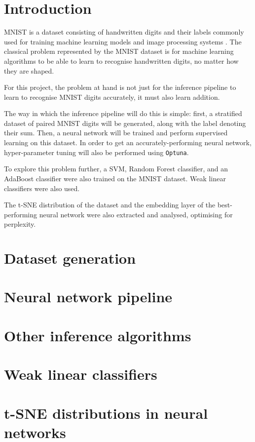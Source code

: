 \documentclass[11pt,a4paper]{article}
\begin{document}
 

\section{Introduction}

MNIST is a dataset consisting of handwritten digits and their labels commonly used for training machine learning models and image processing systems \citep{deng2012mnist}. The classical problem represented by the MNIST dataset is for machine learning algorithms to be able to learn to recognise handwritten digits, no matter how they are shaped.

For this project, the problem at hand is not just for the inference pipeline to learn to recognise MNIST digits accurately, it must also learn addition.


The way in which the inference pipeline will do this is simple: first, a stratified dataset of paired MNIST digits will be generated, along with the label denoting their sum. Then, a neural network will be trained and perform supervised learning on this dataset. In order to get an accurately-performing neural network, hyper-parameter tuning will also be performed using \texttt{Optuna}.

To explore this problem further, a SVM, Random Forest classifier, and an AdaBoost classifier were also trained on the MNIST dataset. Weak linear classifiers were also used.

The t-SNE distribution of the dataset and the embedding layer of the best-performing neural network were also extracted and analysed, optimising for perplexity.

\section{Dataset generation}



\section{Neural network pipeline}

\section{Other inference algorithms}

\section{Weak linear classifiers}

\section{t-SNE distributions in neural networks}




\end{document}
